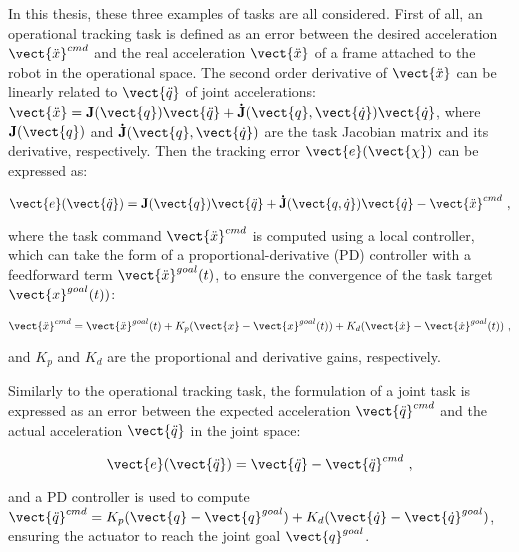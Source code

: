 In this thesis, these three examples of tasks are all considered. First of all, an operational tracking task is defined as an error between the desired acceleration $\vect{\ddot{x}}^{cmd}$ and the real acceleration $\vect{\ddot{x}}$ of a frame attached to the robot in the operational space. The second order derivative of $\vect{\ddot{x}}$ can be linearly related to $\vect{\ddot{q}}$ of joint accelerations: $\vect{\ddot{x}}=\mathbf{J}(\vect{q})\vect{\ddot{q}} + \mathbf{\dot{J}}(\vect{q},\vect{\dot{q}})\vect{\dot{q}}$, where $\mathbf{J}(\vect{q})$ and $\mathbf{\dot{J}}(\vect{q},\vect{\dot{q}})$ are the task Jacobian matrix and its derivative, respectively. Then the tracking error $\vect{e}(\vect{\chi})$ can be expressed as: 
\begin{singlespace}
\begin{equation}\label{eq:task definition}
\vect{e}(\vect{\ddot{q}}) = \mathbf{J}(\vect{q})\vect{\ddot{q}} + \mathbf{\dot{J}}(\vect{q,\dot{q}})\vect{\dot{q}}-\vect{\ddot{x}}^{cmd} ~,
\end{equation}
\end{singlespace}
\noindent where the task command $\vect{\ddot{x}}^{cmd}$ is computed using a local controller, which can take the form of a proportional-derivative (PD) controller with a feedforward term $\vect{\ddot{x}}^{goal}(t)$, to ensure the convergence of the task target $\vect{x}^{goal}(t))$:
\begin{singlespace}
\begin{equation}
    \vect{\ddot{x}}^{cmd} = \vect{\ddot{x}}^{goal}(t) + K_p (\vect{x} - \vect{x}^{goal}(t)) + K_d (\vect{\dot{x}} - \vect{\dot{x}}^{goal}(t)) ~,
\end{equation}
\end{singlespace}
\noindent and $K_p$ and $K_d$ are the proportional and derivative gains, respectively.

Similarly to the operational tracking task, the formulation of a joint task is expressed as an error between the expected acceleration $\vect{\ddot{q}}^{cmd}$ and the actual acceleration $\vect{\ddot{q}}$ in the joint space:
\begin{singlespace}
\begin{equation}
\vect{e}(\vect{\ddot{q}}) = \vect{\ddot{q}} -\vect{\ddot{q}}^{cmd} ~,
\end{equation}
\end{singlespace}
\noindent and a PD controller is used to compute $\vect{\ddot{q}}^{cmd}= K_p (\vect{q}-\vect{q}^{goal}) + K_d(\vect{\dot{q}}-\vect{\dot{q}}^{goal})$, ensuring the actuator to reach the joint goal $\vect{q}^{goal}$.

